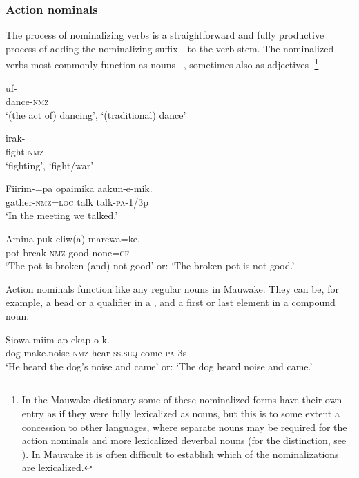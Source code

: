 \subsubsection{Action nominals}\label{sec:3.2.6.1}
{}
The process of nominalizing verbs is a straightforward and fully productive process of adding the nominalizing suffix - to the verb stem. The nominalized verbs most commonly function as nouns --, sometimes also as adjectives .\footnote{In the Mauwake dictionary some of these nominalized forms have their own entry as if they were fully lexicalized as nouns, but this is to some extent a concession to other languages, where separate nouns may be required for the action nominals and more lexicalized deverbal nouns (for the distinction, see \citealt[193]{Ylikoski2003}). In Mauwake it is often difficult to establish which of the nominalizations are lexicalized.}

\ea%
\label{ex:3:x62}
\gll uf- \\
dance-\textsc{nmz}\\
\glt`(the act of) dancing', `(traditional) dance'
\z

\ea%
\label{ex:3:x63}
\gll irak- \\
fight-\textsc{nmz}\\
\glt`fighting', `fight/war' 
\z 

\ea%
\label{ex:3:x1231}
\gll Fiirim-=pa opaimika aakun-e-mik. \\
gather-\textsc{nmz}=\textsc{loc} talk talk-\textsc{pa}-1/3p\\
\glt`In the meeting we talked.'
\z

\ea%
\label{ex:3:x1247}
\gll Amina puk eliw(a) marewa=ke. \\
pot break-\textsc{nmz} good none=\textsc{cf}\\
\glt`The pot is broken (and) not good' or: `The broken pot is not good.'
\z

Action nominals function like any regular nouns in Mauwake. They can be, for example, a head  or a qualifier  in a , and a first  or last element  in a compound noun.

\ea%
\label{ex:3:x64}
\gll Siowa  miim-ap ekap-o-k. \\
dog make.noise-\textsc{nmz} hear-\textsc{ss}.\textsc{seq} come-\textsc{pa}-3s\\
\glt`He heard the dog's noise and came' or: `The dog heard noise and came.'
\z

